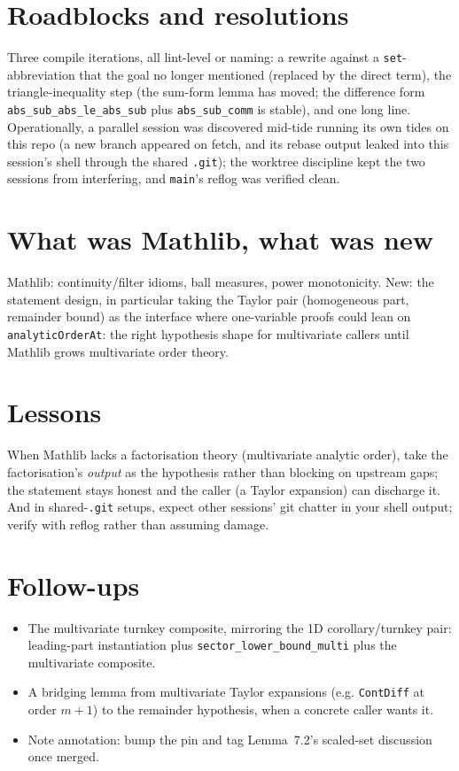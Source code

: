 \documentclass[11pt]{article}
\begin{document}
\section{Roadblocks and resolutions}

Three compile iterations, all lint-level or naming: a rewrite against a
\texttt{set}-abbreviation that the goal no longer mentioned (replaced by
the direct term), the triangle-inequality step (the sum-form lemma has
moved; the difference form \texttt{abs\_sub\_abs\_le\_abs\_sub} plus
\texttt{abs\_sub\_comm} is stable), and one long line. Operationally, a
parallel session was discovered mid-tide running its own tides on this
repo (a new branch appeared on fetch, and its rebase output leaked into
this session's shell through the shared \texttt{.git}); the worktree
discipline kept the two sessions from interfering, and \texttt{main}'s
reflog was verified clean.

\section{What was Mathlib, what was new}

Mathlib: continuity/filter idioms, ball measures, power monotonicity. New:
the statement design, in particular taking the Taylor pair (homogeneous
part, remainder bound) as the interface where one-variable proofs could
lean on \texttt{analyticOrderAt}: the right hypothesis shape for
multivariate callers until Mathlib grows multivariate order theory.

\section{Lessons}

When Mathlib lacks a factorisation theory (multivariate analytic order),
take the factorisation's \emph{output} as the hypothesis rather than
blocking on upstream gaps; the statement stays honest and the caller (a
Taylor expansion) can discharge it. And in shared-\texttt{.git} setups,
expect other sessions' git chatter in your shell output; verify with
reflog rather than assuming damage.

\section{Follow-ups}

\begin{itemize}
\item The multivariate turnkey composite, mirroring the 1D
corollary/turnkey pair: leading-part instantiation plus
\texttt{sector\_lower\_bound\_multi} plus the multivariate composite.
\item A bridging lemma from multivariate Taylor expansions (e.g.
\texttt{ContDiff} at order $m{+}1$) to the remainder hypothesis, when a
concrete caller wants it.
\item Note annotation: bump the pin and tag Lemma~7.2's scaled-set
discussion once merged.
\end{itemize}
\end{document}
